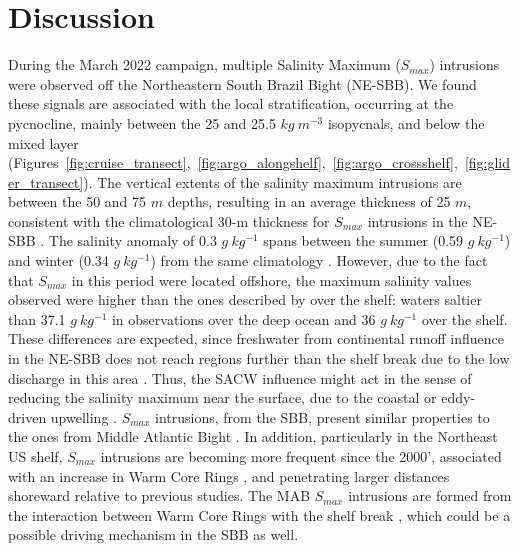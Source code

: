 \documentclass[draft]{agujournal2019}
\begin{document}
\section{Discussion}
\label{section:discussion}

During the March 2022 campaign, multiple Salinity Maximum (\textit{$S_{max}$}) intrusions were observed off the Northeastern South Brazil Bight (NE-SBB). We found these signals are associated with the local stratification, occurring at the pycnocline, mainly between the 25 and 25.5 $kg\ m^{-3}$ isopycnals, and below the mixed layer (Figures~\ref{fig:cruise_transect},~\ref{fig:argo_alongshelf},~\ref{fig:argo_crossshelf},~\ref{fig:glider_transect}). The vertical extents of the salinity maximum intrusions are between the 50 and 75 $m$ depths, resulting in an average thickness of 25 $m$, consistent with the climatological 30-m thickness for \textit{$S_{max}$} intrusions in the NE-SBB \cite{silva2023inventory}. The salinity anomaly of 0.3 $g\ kg^{-1}$ spans between the summer (0.59 $g\ kg^{-1}$) and winter (0.34 $g\ kg^{-1}$) from the same climatology \cite{silva2023inventory}. 
However, due to the fact that \textit{$S_{max}$} in this period were located offshore, the maximum salinity values observed were higher than the ones described by  over the shelf: waters saltier than 37.1 $g\ kg^{-1}$ in observations over the deep ocean and 36 $g\ kg^{-1}$ over the shelf. These differences are expected, since freshwater from continental runoff influence in the NE-SBB does not reach regions further than the shelf break due to the low discharge in this area \cite{cerda2014,castro2014summer}. Thus, the SACW influence might act in the sense of reducing the salinity maximum near the surface, due to the coastal or eddy-driven upwelling \cite{Campos2000,cerda2014,castro2014summer}. \textit{$S_{max}$} intrusions, from the SBB, present similar properties to the ones from Middle Atlantic Bight \cite<MAB, >{Lentz2003}. In addition, particularly in the Northeast US shelf, \textit{$S_{max}$} intrusions are becoming more frequent since the 2000', associated with an increase in Warm Core Rings \cite{gangopadhyay2019observed,silver2023increased}, and penetrating larger distances shoreward \cite{gawarkiewicz2022increasing} relative to previous studies. The MAB \textit{$S_{max}$} intrusions are formed from the interaction between Warm Core Rings with the shelf break \cite{silver2023increased}, which could be a possible driving mechanism in the SBB as well.
\end{document}
